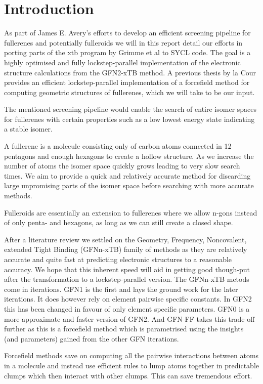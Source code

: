 \section{Introduction}
As part of James E. Avery's efforts to develop an efficient screening pipeline for fullerenes and potentially fulleroids we will in this report detail our efforts in porting parts of the xtb program by Grimme et al to SYCL code. The goal is a highly optimised and fully lockstep-parallel implementation of the electronic structure calculations from the GFN2-xTB method. A previous thesis by la Cour provides an efficient lockstep-parallel implementation of a forcefield method for computing geometric structures of fullerenes, which we will take to be our input. 

The mentioned screening pipeline would enable the search of entire isomer spaces for fullerenes with certain properties such as a low lowest energy state indicating a stable isomer. 

A fullerene is a molecule consisting only of carbon atoms connected in 12 pentagons and enough hexagons to create a hollow structure. As we increase the number of atoms the isomer space quickly grows leading to very slow search times. We aim to provide a quick and relatively accurate method for discarding large unpromising parts of the isomer space before searching with more accurate methods.

Fulleroids are essentially an extension to fullerenes where we allow n-gons instead of only penta- and hexagons, as long as we can still create a closed shape. 

After a literature review we settled on the Geometry, Frequency, Noncovalent, extended Tight Binding (GFNn-xTB) family of methods as they are relatively accurate and quite fast at predicting electronic structures to a reasonable accuracy. We hope that this inherent speed will aid in getting good though-put after the transformation to a lockstep-parallel version. The GFNn-xTB metods come in iterations. GFN1 is the first and lays the ground work for the later iterations. It does however rely on element pairwise specific constants. In GFN2 this has been changed in favour of only element specific parameters. GFN0 is a more approximate and faster version of GFN2. And GFN-FF takes this trade-off further as this is a forcefield method which is parametrised using the insights (and parameters) gained from the other GFN iterations. 

Forcefield methods save on computing all the pairwise interactions between atoms in a molecule and instead use efficient rules to lump atoms together in predictable clumps which then interact with other clumps. This can save tremendous effort. 


